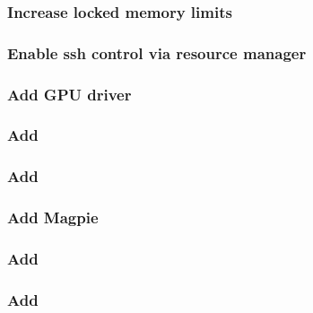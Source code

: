 \documentclass{ohpc-doc}
\begin{document}
\subsubsection{Increase locked memory limits}


\subsubsection{Enable ssh control via resource manager}


%
%
%

\subsubsection{Add GPU driver}


\subsubsection{Add \clustershell{}}


\subsubsection{Add \genders{}}


\subsubsection{Add Magpie}


\subsubsection{Add \conman{}} \label{sec:add_conman}


\subsubsection{Add \nhc{}} \label{sec:add_nhc}



%
%
\end{document}
